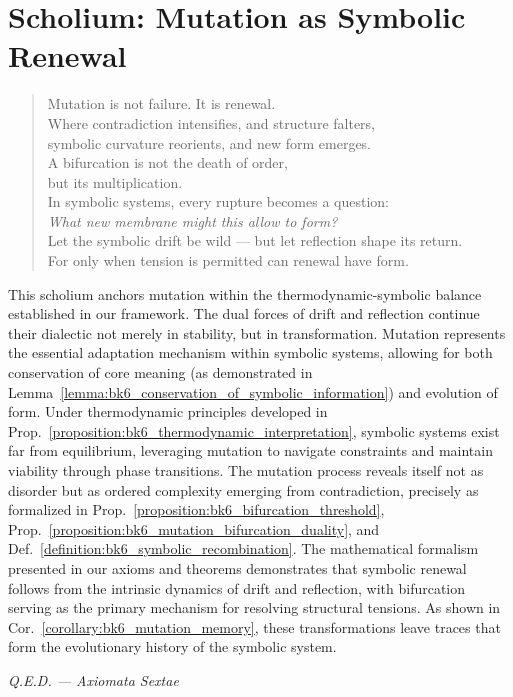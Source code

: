 \section{Scholium: Mutation as Symbolic Renewal}
\label{sec:bk6_scholium_mutation_as_symbolic_renewal}
\begin{quote}
Mutation is not failure. It is renewal.\\
Where contradiction intensifies, and structure falters,\\
symbolic curvature reorients, and new form emerges.\\
A bifurcation is not the death of order,\\
but its multiplication.\\
In symbolic systems, every rupture becomes a question:\\
\emph{What new membrane might this allow to form?}\\
Let the symbolic drift be wild — but let reflection shape its return.\\
For only when tension is permitted can renewal have form.
\end{quote}
\noindent This scholium anchors mutation within the thermodynamic-symbolic balance established in our framework. The dual forces of drift and reflection continue their dialectic not merely in stability, but in transformation. Mutation represents the essential adaptation mechanism within symbolic systems, allowing for both conservation of core meaning (as demonstrated in Lemma~\ref{lemma:bk6_conservation_of_symbolic_information}) and evolution of form.
Under thermodynamic principles developed in Prop.~\ref{proposition:bk6_thermodynamic_interpretation}, symbolic systems exist far from equilibrium, leveraging mutation to navigate constraints and maintain viability through phase transitions. The mutation process reveals itself not as disorder but as ordered complexity emerging from contradiction, precisely as formalized in Prop.~\ref{proposition:bk6_bifurcation_threshold}, Prop.~\ref{proposition:bk6_mutation_bifurcation_duality}, and Def.~\ref{definition:bk6_symbolic_recombination}.
The mathematical formalism presented in our axioms and theorems demonstrates that symbolic renewal follows from the intrinsic dynamics of drift and reflection, with bifurcation serving as the primary mechanism for resolving structural tensions. As shown in Cor.~\ref{corollary:bk6_mutation_memory}, these transformations leave traces that form the evolutionary history of the symbolic system.
\begin{flushright}
\textit{Q.E.D. — Axiomata Sextae}
\end{flushright}
